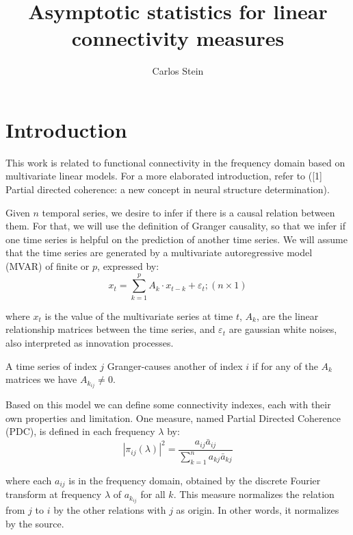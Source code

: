 \documentclass[a4paper,10pt]{article}
\title{Asymptotic statistics for linear connectivity measures}
\author{Carlos Stein}
\begin{document}
\maketitle

\begin{abstract}

\end{abstract}

\section{Introduction}

This work is related to functional connectivity in the frequency domain based on multivariate linear models. For a more elaborated introduction, refer to ([1] Partial directed coherence: a new concept in neural structure determination).

Given $n$ temporal series, we desire to infer if there is a causal relation between them. For that, we will use the definition of Granger causality, so that we infer if one time series is helpful on the prediction of another time series. We will assume that the time series are generated by a multivariate autoregressive model (MVAR) of finite or $p$, expressed by:
\begin{equation}
x_{t} = \sum_{k=1}^{p}{A_{k}\cdot x_{t-k}} + \varepsilon_{t}; (n \times 1)
\end{equation}

where $x_{t}$  is the value of the multivariate series at time $t$, $A_k$, are the linear relationship matrices between the time series, and $\varepsilon_{t}$ are gaussian white noises, also interpreted as innovation processes.

A time series of index $j$ Granger-causes another of index $i$ if for any of the $A_k$ matrices we have $A_{k_{ij}} \neq 0$.

Based on this model we can define some connectivity indexes, each with their own properties and limitation. One measure, named Partial Directed Coherence (PDC), is defined in each frequency $\lambda$ by:
\begin{equation}
|\pi_{ij}(\lambda)|^{2} = \frac{a_{ij} \bar{a}_{ij}}{\sum_{k=1}^{n}{a_{kj} \bar{a}_{kj}}}  
\end{equation}

where each $a_{ij}$ is in the frequency domain, obtained by the discrete Fourier transform at frequency $\lambda$ of $a_{k_{ij}}$ for all $k$. This measure normalizes the relation from $j$ to $i$ by the other relations with $j$ as origin. In other words, it normalizes by the source.
\end{document}
